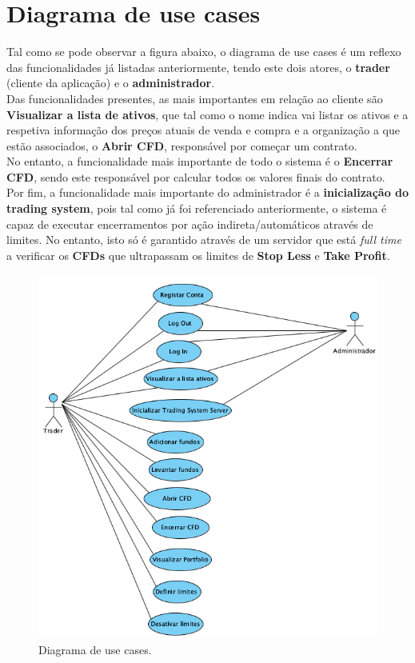 \documentclass[11pt,a4paper]{report}%
\begin{document}
\newpage

\section{Diagrama de use cases}

Tal como se pode observar a figura abaixo, o diagrama de use cases é um reflexo das funcionalidades já listadas anteriormente, tendo este dois atores, o \textbf{trader} (cliente da aplicação) e o \textbf{administrador}. \\
Das funcionalidades presentes, as mais importantes em relação ao cliente são \textbf{Visualizar a lista de ativos}, que tal como o nome indica vai listar os ativos e a respetiva informação dos preços atuais de venda e compra e a organização a que estão associados, o \textbf{Abrir CFD}, responsável por começar um contrato. \\ No entanto, a funcionalidade mais importante de todo o sistema é o \textbf{Encerrar CFD}, sendo este responsável por calcular todos os valores finais do contrato. \\ Por fim, a funcionalidade mais importante do administrador é a \textbf{inicialização do trading system}, pois tal como já foi referenciado anteriormente, o sistema é capaz de executar encerramentos por ação indireta/automáticos através de limites. No entanto, isto só é garantido através de um servidor que está \emph{full time} a verificar os \textbf{CFDs} que ultrapassam os limites de \textbf{Stop Less} e \textbf{Take Profit}. 

\begin{figure}[H]
	\centering
	\includegraphics[scale=0.6]{diagrama-use-cases.png}
	\caption{Diagrama de use cases. }
	\label{img:pag}
\end{figure}
\end{document}
